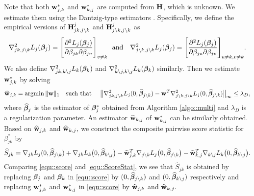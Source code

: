 \documentclass[twoside,11pt]{article}
\newcommand{\defeq}{\vcentcolon=}
\newcommand*{\hbgamma} {\hat{\bgamma}}
\newcommand*{\hbbeta}{\hat{\bbeta}}
\newcommand*{\hw}{\hat{\wb}}
\newcommand*{\sw}{\wb^*}
\begin{document}
Note that both $\sw_{j , k}$ and $\sw_{k, j}$ are computed from $\mathbf{H}$, which is  unknown.  We estimate  them using the Dantzig-type estimators \citep{candes2007dantzig}.
Specifically, we define the empirical versions of $\mathbf{H}_{jk,j \setminus k}^j$ and $\mathbf{H}_{j\setminus k ,j\setminus k}^{j}$ as 
$$
\nabla_{jk,j \setminus k}^2 L_j(\bm{\beta}_j) = \Biggl[ \frac{\partial ^2 L_j(\bm{\beta}_j) }{\partial \beta_{jk}\partial \beta_{j v}}\Biggr]_{v\neq k} ~~\text{and} \quad \nabla_{j\setminus k,j \setminus k}^2 L_j(\bm{\beta}_j) = \Biggl[ \frac{\partial ^2 L_j(\bm{\beta}_j) }{\partial \beta_{ju }\partial \beta_{j v}}\Biggr]_{u \neq k ,v\neq k}.
$$
We also define $\nabla_{jk,k\setminus j}^2 L_k(\bm{\beta}_k)$ and $\nabla_{k\setminus j ,k\setminus j}^2 L_k(\bm{\beta}_k)$  similarly. 
Then we estimate $\sw_{j,k}$ by solving  
\begin{align}\label{equ::Dantzig}
\hw_{j , k} =\argmin  \|\wb  \|_{1} \quad \text{such that } \quad 
\big\|\nabla_{jk,j\setminus k}^2  L_{j}(0,\hbbeta_{j\setminus k}) - \wb^T \nabla_{j\setminus k,j \setminus k}^2  L_{j}(0,\hbbeta_{j \setminus k})\big\|_{\infty} \leq \lambda_D,
\end{align}
where $\hbbeta_j$ is the estimator of $\bm{\beta}_j^*$ obtained from Algorithm \ref{algo::multi} 
and $\lambda_D$ is a regularization parameter.
 An estimator $\hw_{k,j}$ of $\sw_{k,j}$ can be similarly obtained.
Based on  $\hw_{j,k}$ and $\hw_{k,j},$ we  construct the  composite pairwise score statistic for $\beta_{jk}^*$ by 
\begin{align}\label{equ::ScoreStat}
\hat{S}_{jk} = \nabla_{jk}  L_{j} (0,\hbbeta_{j\setminus k}) + \nabla_{jk}L_k\bigl(0,\hbbeta_{k\setminus j}\bigr) - {\hw_{j,k}} ^T \nabla_{j\setminus k} L _{j}\bigl(0,\hbbeta_{j\setminus k}\bigr) - {\hw_{k ,j }}^T \nabla_{k\setminus j} L_k \bigl(0,\hbbeta_{k\setminus j}\bigr).
\end{align}
Comparing \eqref{equ::score} and \eqref{equ::ScoreStat}, we see that $ \hat{S}_{jk}$  is obtained  by replacing $\bm{\beta}_j$ and $\bm{\beta}_k$ in \eqref{equ::score} by  $(0, \hbbeta_{j\setminus k})$ and $(0,\hbbeta_{k\setminus j})$ respectively and replacing $\sw_{j,k}$ and $\sw_{k,j}$ in \eqref{equ::score} by $\hw_{j,k}$ and $\hw_{k,j}.$
\end{document}
